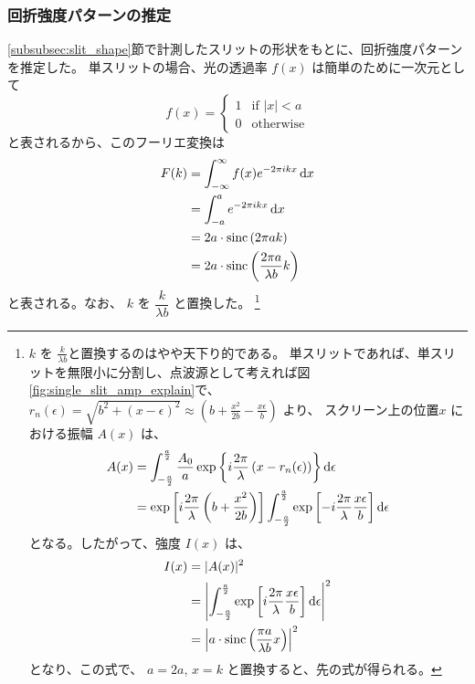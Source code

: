 \documentclass[../../../main]{subfiles}
\begin{document}
\subsubsection{回折強度パターンの推定}
\ref{subsubsec:slit_shape}節で計測したスリットの形状をもとに、回折強度パターンを推定した。
単スリットの場合、光の透過率 \( f(x) \) は簡単のために一次元として
\begin{equation}
	f(x) =
	\begin{cases}
		1 & \text{if } |x| < a \\
		0 & \text{otherwise}
	\end{cases}
\end{equation}
と表されるから、このフーリエ変換は
\begin{equation}\label{eq:single_slit_ft}
	\begin{aligned}
		F(k) & = \int_{-\infty}^{\infty} f(x) e^{- 2 \pi i k x } \odif{x}           \\
		     & = \int_{-a}^{a} e^{- 2\pi i k x} \odif{x}                            \\
		     & = 2a \cdot \mathrm{sinc} \left( 2\pi a k \right)                     \\
		     & = 2a \cdot \mathrm{sinc} \left( \dfrac{2\pi a}{\lambda b} k  \right)
	\end{aligned}
\end{equation}
と表される。なお、 \( k \) を \( \dfrac{k}{\lambda b}  \)  と置換した。
\footnote{
	\( k \) を \( \frac{k}{\lambda b}  \)と置換するのはやや天下り的である。
	単スリットであれば、単スリットを無限小に分割し、点波源として考えれば図\ref{fig:single_slit_amp_explain}で、
	\( r_n(\epsilon) = \sqrt{b^2+ \left( x - \epsilon \right)^2} \approx \left( b + \frac{x^2}{2b} - \frac{x \epsilon}{b}   \right) \) より、
	スクリーン上の位置\( x \) における振幅 \( A(x) \) は、
	\begin{equation}
		\begin{aligned}
			A(x) & = \int_{-\frac{a}{2}}^{\frac{a}{2}} \dfrac{A_0}{a} \exp \left\{ i \dfrac{2\pi}{\lambda} \left( x - r_n(\epsilon) \right)  \right\} \odif{\epsilon}                                                       \\
			     & = \exp \left[ i \dfrac{2\pi}{\lambda} \left( b + \dfrac{x^2}{2b}  \right)  \right] \int_{-\frac{a}{2}}^{\frac{a}{2}} \exp \left[ -i \dfrac{2\pi}{\lambda} \dfrac{x \epsilon}{b}  \right] \odif{\epsilon}
		\end{aligned}
	\end{equation}
	となる。したがって、強度 \( I(x) \) は、
	\begin{equation}
		\begin{aligned}
			I(x) & = | A(x) |^2                                                                                                                            \\
			     & = \left| \int_{-\frac{a}{2}}^{\frac{a}{2}} \exp \left[ i \dfrac{2\pi}{\lambda} \dfrac{x \epsilon}{b}  \right] \odif{\epsilon} \right|^2 \\
			     & = \left| a \cdot \mathrm{sinc}\left( \dfrac{\pi a}{\lambda b} x  \right)  \right|^2
		\end{aligned}
	\end{equation}
	となり、この式で、 \( a = 2a \), \( x = k \) と置換すると、先の式が得られる。
}
\end{document}
